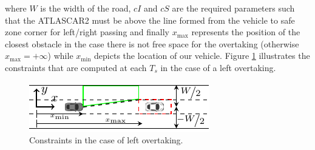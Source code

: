 \documentclass[conference,11pt]{IEEEtran}
\begin{document}
where $W$ is the width of the road, $cI$ and $cS$ are the required parameters such that the ATLASCAR2 must be above the line formed from the vehicle to safe zone corner for left/right passing and finally $x_{\max}$ represents the position of the closest obstacle in the case there is not free space for the overtaking (otherwise $x_{\max}=+\infty$) while $x_{\min}$ depicts the location of our vehicle. Figure \ref{fig:constraint} illustrates the constraints that are computed at each $T_s$ in the case of a left overtaking.
\begin{figure}[!h]
	\centering
	\includegraphics[width=\columnwidth]{./figure/constraint/constraint.pdf}
	\caption{Constraints in the case of left overtaking.}
	\label{fig:constraint}
\end{figure}
\end{document}
